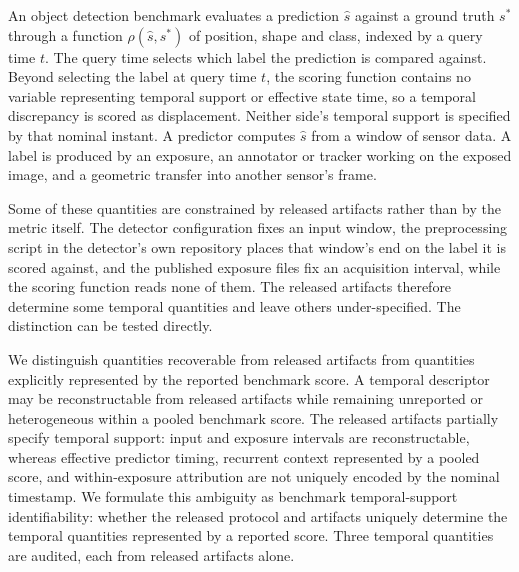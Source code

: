 \documentclass[10pt,twocolumn,letterpaper]{article}
\begin{document}
An object detection benchmark evaluates a prediction $\hat{s}$ against a ground
truth $s^{*}$ through a function $\rho(\hat{s},s^{*})$ of position, shape and
class, indexed by a query time $t$. The query time selects which label the
prediction is compared against. Beyond selecting the label at query time $t$, the
scoring function contains no variable representing temporal support or effective state
time, so a temporal discrepancy is scored as displacement. Neither side's
temporal support is specified by that nominal instant. A predictor computes $\hat{s}$ from a
window of sensor data. A label is produced by an exposure, an annotator or
tracker working on the exposed image, and a geometric transfer into another
sensor's frame.

Some of these quantities are constrained by released artifacts rather than by the metric itself. The
detector configuration fixes an input window, the preprocessing script in the detector's own
repository places that window's end on the label it is scored against, and the published
exposure files fix an acquisition interval, while the scoring function reads none of them.
The released artifacts therefore determine some temporal quantities and leave others
under-specified. The distinction can be tested directly.

We distinguish quantities recoverable from released artifacts from quantities explicitly
represented by the reported benchmark score. A temporal descriptor may be reconstructable
from released artifacts while remaining unreported or heterogeneous within a pooled benchmark
score. The released artifacts partially specify
temporal support: input and exposure intervals are reconstructable, whereas effective
predictor timing, recurrent context represented by a pooled score, and within-exposure
attribution are not uniquely encoded by the nominal timestamp.
We formulate this ambiguity as benchmark temporal-support identifiability: whether the released
protocol and artifacts uniquely determine the temporal quantities represented by a reported score.
Three temporal quantities are audited, each from released artifacts alone.
\end{document}
